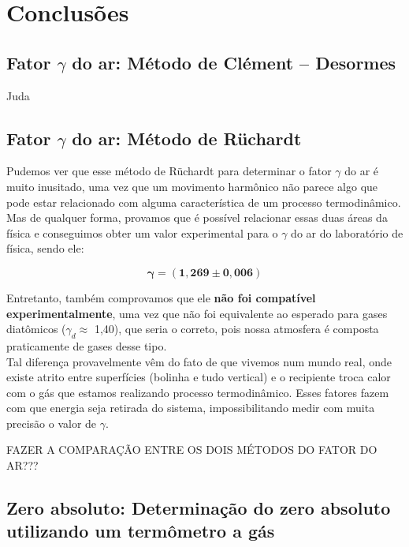 \newpage
\section{Conclusões}

\subsection{Fator $\gamma$ do ar: Método de Clément – Desormes}

Juda

\subsection{Fator $\gamma$ do ar: Método de Rüchardt}

Pudemos ver que esse método de Rüchardt para determinar o fator $\gamma$ do ar é muito inusitado, uma vez que um movimento harmônico não parece algo que pode estar relacionado com alguma característica de um processo termodinâmico. Mas de qualquer forma, provamos que é possível relacionar essas duas áreas da física e conseguimos obter um valor experimental para o $\gamma$ do ar do laboratório de física, sendo ele:

\[ \mathbf{\gamma = (1,269 \pm 0,006)} \]

Entretanto, também comprovamos que ele \textbf{não foi compatível experimentalmente}, uma vez que não foi equivalente ao esperado para gases diatômicos ($\gamma_d \approx$ 1,40), que seria o correto, pois nossa atmosfera é composta praticamente de gases desse tipo.\\

Tal diferença provavelmente vêm do fato de que vivemos num mundo real, onde existe atrito entre superfícies (bolinha e tudo vertical) e o recipiente troca calor com o gás que estamos realizando processo termodinâmico. Esses fatores fazem com que energia seja retirada do sistema, impossibilitando medir com muita precisão o valor de $\gamma$.

\textit{}{FAZER A COMPARAÇÃO ENTRE OS DOIS MÉTODOS DO FATOR DO AR???}

\subsection{Zero absoluto: Determinação do zero absoluto utilizando um termômetro a
gás}

